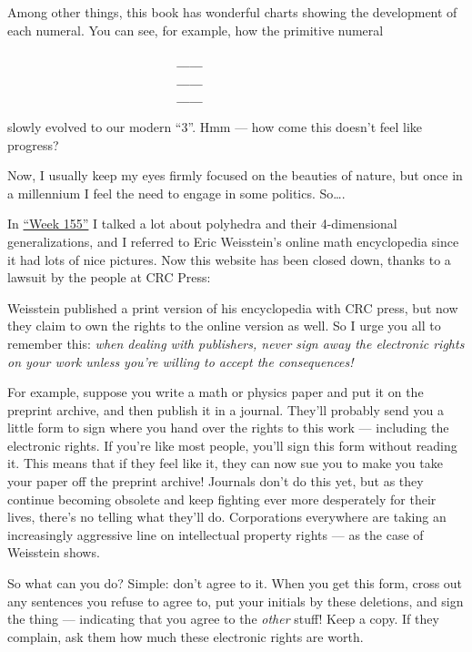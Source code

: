 \documentclass{article}
\def\tightlist{}
\renewcommand{\texttt}[1]{%
  \begingroup
  \ttfamily
  \begingroup\lccode`~=`/\lowercase{\endgroup\def~}{/\discretionary{}{}{}}%
  \begingroup\lccode`~=`[\lowercase{\endgroup\def~}{[\discretionary{}{}{}}%
  \begingroup\lccode`~=`.\lowercase{\endgroup\def~}{.\discretionary{}{}{}}%
  \catcode`/=\active\catcode`[=\active\catcode`.=\active
  \scantokens{#1\noexpand}%
  \endgroup
}
\begin{document}
Among other things, this book has wonderful charts showing the
development of each numeral. You can see, for example, how the primitive
numeral

\begin{verbatim}
                          ____
                          ____
                          ____
\end{verbatim}

slowly evolved to our modern ``3''. Hmm --- how come this doesn't feel
like progress?

Now, I usually keep my eyes firmly focused on the beauties of nature,
but once in a millennium I feel the need to engage in some politics.
So\ldots.

In \protect\hyperlink{week155}{``Week 155''} I talked a lot about
polyhedra and their 4-dimensional generalizations, and I referred to
Eric Weisstein's online math encyclopedia since it had lots of nice
pictures. Now this website has been closed down, thanks to a lawsuit by
the people at CRC Press:


Weisstein published a print version of his encyclopedia with CRC press,
but now they claim to own the rights to the online version as well. So I
urge you all to remember this: \emph{when dealing with publishers, never
sign away the electronic rights on your work unless you're willing to
accept the consequences!}

For example, suppose you write a math or physics paper and put it on the
preprint archive, and then publish it in a journal. They'll probably
send you a little form to sign where you hand over the rights to this
work --- including the electronic rights. If you're like most people,
you'll sign this form without reading it. This means that if they feel
like it, they can now sue you to make you take your paper off the
preprint archive! Journals don't do this yet, but as they continue
becoming obsolete and keep fighting ever more desperately for their
lives, there's no telling what they'll do. Corporations everywhere are
taking an increasingly aggressive line on intellectual property rights
--- as the case of Weisstein shows.

So what can you do? Simple: don't agree to it. When you get this form,
cross out any sentences you refuse to agree to, put your initials by
these deletions, and sign the thing --- indicating that you agree to the
\emph{other} stuff! Keep a copy. If they complain, ask them how much
these electronic rights are worth.
\end{document}
